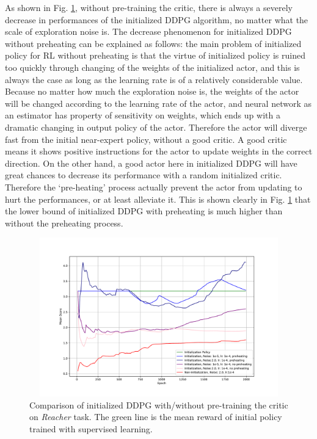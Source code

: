 \documentclass{article}
\begin{document}
As shown in Fig. \ref{fig:pretrain}, without pre-training the critic, there is always a severely decrease in performances of the initialized DDPG algorithm, no matter what the scale of exploration noise is. The decrease phenomenon for initialized DDPG without preheating can be explained as follows: the main problem of initialized policy for RL without preheating is that the virtue of initialized policy is ruined too quickly through changing of the weights of the initialized actor, and this is always the case as long as the learning rate is of a relatively considerable value. Because no matter how much the exploration noise is, the weights of the actor will be changed according to the learning rate of the actor, and neural network as an estimator has property of sensitivity on weights, which ends up with a dramatic changing in output policy of the actor. Therefore the actor will diverge fast from the initial near-expert policy, without a good critic. A good critic means it shows positive instructions for the actor to update weights in the correct direction. On the other hand, a good actor here in initialized DDPG will have great chances to decrease its performance with a random initialized critic. Therefore the `pre-heating' process actually prevent the actor from updating to hurt the performances, or at least alleviate it. This is shown clearly in Fig. \ref{fig:pretrain} that the lower bound of initialized DDPG with preheating is much higher than without the preheating process.
\begin{figure}[htbp]
	\centering
	\includegraphics[height=260, width=450]{img/ddpg_compare2.pdf}
	\caption{Comparison of initialized DDPG with/without pre-training the critic on \textit{Reacher} task. The green line is the mean reward of initial policy trained with supervised learning.}
	\label{fig:pretrain}
\end{figure}
\end{document}
